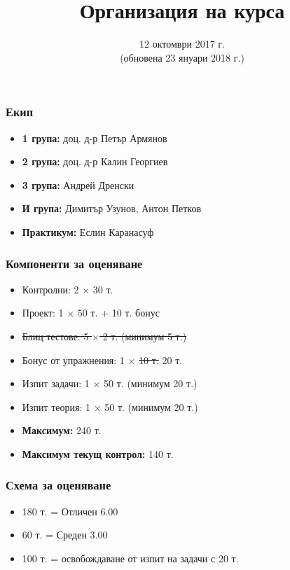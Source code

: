 \documentclass{beamer}
\title{Организация на курса}
\date[12 октомври 2017 г.]{12 октомври 2017 г.\\
  (обновена 23 януари 2018 г.)
}
\begin{document}
\begin{frame}
  \titlepage
\end{frame}

\begin{frame}
  \frametitle{Екип}

  \begin{itemize}
  \item \textbf{1 група:} доц. д-р Петър Армянов
  \item \textbf{2 група:} доц. д-р Калин Георгиев
  \item \textbf{3 група:} Андрей Дренски
  \item \textbf{И група:} Димитър Узунов, Антон Петков 
  \item \textbf{Практикум:} Еслин Каранасуф
  \end{itemize}
\end{frame}

\begin{frame}
  \frametitle{Компоненти за оценяване}

  \begin{itemize}
  \item Контролни: 2 $\times$ 30 т.
  \item Проект: 1 $\times$ 50 т. + 10 т. бонус
  \item \sout{Блиц тестове: 5 $\times$ 2 т. \alert{(минимум 5 т.)}}
  \item Бонус от упражнения: 1 $\times$ \sout{10 т.} \alert{20 т.}
  \item Изпит задачи: 1 $\times$ 50 т. \alert{(минимум 20 т.)}
  \item Изпит теория: 1 $\times$ 50 т. \alert{(минимум 20 т.)}
  \item \textbf{Максимум:} 240 т.
  \item \textbf{Максимум текущ контрол:} 140 т.
  \end{itemize}
\end{frame}

\begin{frame}
  \frametitle{Схема за оценяване}

  \begin{itemize}
  \item 180 т. = Отличен 6.00
  \item 60 т. = Среден 3.00
  \item 100 т. = освобождаване от изпит на задачи с 20 т.
  \end{itemize}
\end{frame}
\end{document}
